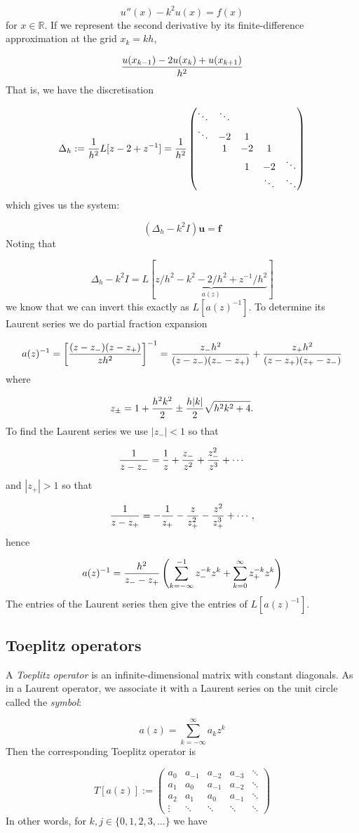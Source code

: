 \documentclass[12pt,a4paper]{article}
\def\R{ {\mathbb R} }
\def\vc#1{ {\mathbf #1} }
\def\br[#1]{\left[{#1}\right]}
\def\sopmatrix#1{ \begin{pmatrix}#1\end{pmatrix} }
\begin{document}
\[
u''(x) - k^2 u(x) = f(x)
\]
for $x \in \R$. If we represent the second derivative by its finite-difference approximation at the grid $x_k = k h$,

\[
{u(x_{k-1}) -2 u(x_k) + u(x_{k+1}) \over h^2}
\]
That is, we have the discretisation

\[
\Delta_h := {1 \over h^2}L[z-2+z^{-1}] = {1 \over h^2} \sopmatrix{\ddots & \ddots \\
                \ddots & -2 & 1 \\
                & 1 & -2 & 1 \\
                && 1 & -2 & \ddots \\
                &&&\ddots & \ddots}
\]
which gives us the system:

\[
(\Delta_h - k^2 I) \vc u = \vc f
\]
Noting that

\[
\Delta_h - k^2 I  = L[\underbrace{z/h^2  - k^2 - 2/h^2 + z^{-1}/h^2}_{a(z)}]
\]
we know that we can invert this exactly as $L[a(z)^{-1}]$. To determine its Laurent series we do partial fraction expansion

\[
a(z)^{-1} = \br[{(z-z_-) (z - z_+) \over  z h^2} ]^{-1} =
{z_- h^2 \over (z-z_-) (z_--z_+)}  + {z_+ h^2 \over (z-z_+) (z_+-z_-)}
\]
where

\[
z_\pm = 1 + {h^2k^2 \over 2} \pm {h \vert k \vert \over 2} \sqrt{h^2 k^2+4}.
\]
To find the Laurent series we use $|z_-| < 1$ so that

\[
{1 \over z - z_-} = {1 \over z} + {z_- \over z^2} + {z_-^2 \over z^3} + \cdots
\]
and $|z_+| > 1$ so that

\[
{1 \over z - z_+} = -{1 \over z_+} - {z \over z_+^2} - {z^2 \over z_+^3} + \cdots,
\]
hence

\[
a(z)^{-1} = {h^2 \over z_- - z_+} \left(\sum_{k=-\infty}^{-1} z_-^{-k} z^k + \sum_{k=0}^\infty z_+^{-k} z^k\right)
\]
The entries of the Laurent series then give the entries of $L[a(z)^{-1}]$.

\subsection{Toeplitz operators}
A \emph{Toeplitz operator} is an infinite-dimensional matrix with constant diagonals. As in a Laurent operator, we associate it with a Laurent series on the unit circle called the \emph{symbol}:

\[
a(z) = \sum_{k=-\infty}^\infty a_k z^k
\]
Then the corresponding Toeplitz operator is

\[
T[a(z)] := \sopmatrix{
 a_0 & a_{-1} & a_{-2} & a_{-3} & \ddots \\
 a_1 & a_0 & a_{-1} & a_{-2} & \ddots \\
 a_2 & a_1 & a_0 & a_{-1}   & \ddots \\
\vdots & \ddots& \ddots& \ddots & \ddots
}
\]
In other words, for $k,j \in \{0,1,2,3,\dots \}$ we have
\end{document}
